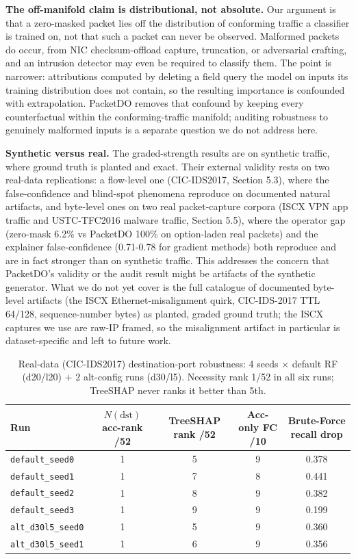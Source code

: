\documentclass[journal]{IEEEtran}
\begin{document}
\textbf{The off-manifold claim is distributional, not absolute.} Our
argument is that a zero-masked packet lies off the distribution of
conforming traffic a classifier is trained on, not that such a packet
can never be observed. Malformed packets do occur, from NIC
checksum-offload capture, truncation, or adversarial crafting, and an
intrusion detector may even be required to classify them. The point is
narrower: attributions computed by deleting a field query the model on
inputs its training distribution does not contain, so the resulting
importance is confounded with extrapolation. PacketDO removes that
confound by keeping every counterfactual within the conforming-traffic
manifold; auditing robustness to genuinely malformed inputs is a
separate question we do not address here.

\textbf{Synthetic versus real.} The graded-strength results are on
synthetic traffic, where ground truth is planted and exact. Their
external validity rests on two real-data replications: a flow-level one
(CIC-IDS2017, Section 5.3), where the false-confidence and blind-spot
phenomena reproduce on documented natural artifacts, and byte-level ones
on two real packet-capture corpora (ISCX VPN app traffic and
USTC-TFC2016 malware traffic, Section 5.5), where the operator gap
(zero-mask 6.2\% vs PacketDO 100\% on option-laden real packets) and the
explainer false-confidence (0.71-0.78 for gradient methods) both
reproduce and are in fact stronger than on synthetic traffic. This
addresses the concern that PacketDO's validity or the audit result might
be artifacts of the synthetic generator. What we do not yet cover is the
full catalogue of documented byte-level artifacts (the ISCX
Ethernet-misalignment quirk, CIC-IDS-2017 TTL 64/128, sequence-number
bytes) as planted, graded ground truth; the ISCX captures we use are
raw-IP framed, so the misalignment artifact in particular is
dataset-specific and left to future work.

\begin{table}[!t]
\centering
\caption{Real-data (CIC-IDS2017) destination-port robustness: 4 seeds $\times$ default RF (d20/l20) $+$ 2 alt-config runs (d30/l5). Necessity rank 1/52 in all six runs; TreeSHAP never ranks it better than 5th.}
\label{tab:robust}
\small
\begin{tabular}{@{}lcccc@{}}
\toprule
Run & $N(\mathrm{dst})$ acc-rank /52 & TreeSHAP rank /52 & Acc-only FC /10 & Brute-Force recall drop \\
\midrule
\texttt{default\_seed0} & 1 & 5 & 9 & 0.378 \\
\texttt{default\_seed1} & 1 & 7 & 8 & 0.441 \\
\texttt{default\_seed2} & 1 & 8 & 9 & 0.382 \\
\texttt{default\_seed3} & 1 & 9 & 9 & 0.199 \\
\texttt{alt\_d30l5\_seed0} & 1 & 5 & 9 & 0.360 \\
\texttt{alt\_d30l5\_seed1} & 1 & 6 & 9 & 0.356 \\
\bottomrule
\end{tabular}
\end{table}
\end{document}
